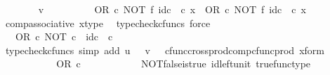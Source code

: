 \begin{isabellebody}
\ \ \ \ \ \ \isamarkupfalse%
\ {\isachardoublequoteopen}v\ {\isacharequal}{\kern0pt}\ {\isasymt}{\isachardoublequoteclose}\isanewline
\ \ \ \ \ \ \isamarkupfalse%
\ {\isachardoublequoteopen}{\isacharparenleft}{\kern0pt}OR\ {\isasymcirc}\isactrlsub c\ NOT\ {\isasymtimes}\isactrlsub f\ id\isactrlsub c\ {\isasymOmega}{\isacharparenright}{\kern0pt}\ {\isasymcirc}\isactrlsub c\ x\ {\isacharequal}{\kern0pt}\ OR\ {\isasymcirc}\isactrlsub c\ {\isacharparenleft}{\kern0pt}NOT\ {\isasymtimes}\isactrlsub f\ id\isactrlsub c\ {\isasymOmega}{\isacharparenright}{\kern0pt}\ {\isasymcirc}\isactrlsub c\ x{\isachardoublequoteclose}\isanewline
\ \ \ \ \ \ \ \ \isamarkupfalse%
\ comp{\isacharunderscore}{\kern0pt}associative{}\ x{\isacharunderscore}{\kern0pt}type\ \isamarkupfalse%
\ {\isacharparenleft}{\kern0pt}typecheck{\isacharunderscore}{\kern0pt}cfuncs{\isacharcomma}{\kern0pt}\ force{\isacharparenright}{\kern0pt}\isanewline
\ \ \ \ \ \ \isamarkupfalse%
\ \isamarkupfalse%
\ {\isachardoublequoteopen}{\isachardot}{\kern0pt}{\isachardot}{\kern0pt}{\isachardot}{\kern0pt}\ {\isacharequal}{\kern0pt}\ OR\ {\isasymcirc}\isactrlsub c\ {\isasymlangle}NOT\ {\isasymcirc}\isactrlsub c\ {\isasymf}{\isacharcomma}{\kern0pt}\ id\isactrlsub c\ {\isasymOmega}\ {\isasymcirc}\isactrlsub c\ {\isasymt}{\isasymrangle}{\isachardoublequoteclose}\isanewline
\ \ \ \ \ \ \ \ \isamarkupfalse%
\ {\isacharparenleft}{\kern0pt}typecheck{\isacharunderscore}{\kern0pt}cfuncs{\isacharcomma}{\kern0pt}\ simp\ add{\isacharcolon}{\kern0pt}\ {\isacartoucheopen}u\ {\isacharequal}{\kern0pt}\ {\isasymf}{\isacartoucheclose}\ {\isacartoucheopen}v\ {\isacharequal}{\kern0pt}\ {\isasymt}{\isacartoucheclose}\ cfunc{\isacharunderscore}{\kern0pt}cross{\isacharunderscore}{\kern0pt}prod{\isacharunderscore}{\kern0pt}comp{\isacharunderscore}{\kern0pt}cfunc{\isacharunderscore}{\kern0pt}prod\ x{\isacharunderscore}{\kern0pt}form{\isacharparenright}{\kern0pt}\isanewline
\ \ \ \ \ \ \isamarkupfalse%
\ \isamarkupfalse%
\ {\isachardoublequoteopen}{\isachardot}{\kern0pt}{\isachardot}{\kern0pt}{\isachardot}{\kern0pt}\ {\isacharequal}{\kern0pt}\ OR\ {\isasymcirc}\isactrlsub c\ {\isasymlangle}{\isasymt}{\isacharcomma}{\kern0pt}\ {\isasymt}{\isasymrangle}{\isachardoublequoteclose}\isanewline
\ \ \ \ \ \ \ \ \isamarkupfalse%
\ NOT{\isacharunderscore}{\kern0pt}false{\isacharunderscore}{\kern0pt}is{\isacharunderscore}{\kern0pt}true\ id{\isacharunderscore}{\kern0pt}left{\isacharunderscore}{\kern0pt}unit{}\ true{\isacharunderscore}{\kern0pt}func{\isacharunderscore}{\kern0pt}type\ \isamarkupfalse%

\end{isabellebody}
